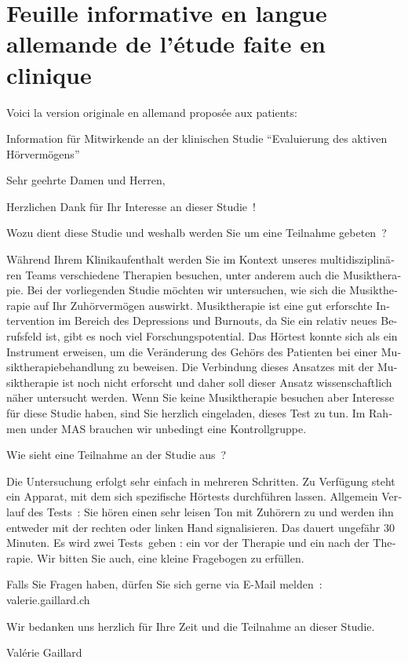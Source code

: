 \section{Feuille informative en langue allemande de l'étude faite en clinique}
Voici la version originale en allemand proposée aux patients:
\begin{german}

Information für Mitwirkende an der klinischen Studie
\foreignquote{german}{Evaluierung des aktiven Hörvermögens}


Sehr geehrte Damen und Herren,

Herzlichen Dank für Ihr Interesse an dieser Studie !

Wozu dient diese Studie und weshalb werden Sie um eine Teilnahme gebeten ?

Während Ihrem Klinikaufenthalt  werden Sie im Kontext
unseres multidisziplinären Teams verschiedene Therapien besuchen, unter anderem auch die Musiktherapie. Bei der vorliegenden Studie möchten wir untersuchen, wie sich die Musiktherapie auf Ihr Zuhörvermögen auswirkt.
Musiktherapie ist eine gut erforschte Intervention im Bereich des Depressions und Burnouts, da Sie ein relativ neues Berufsfeld ist, gibt es noch viel Forschungspotential.
Das Hörtest konnte sich als ein Instrument erweisen, um die Veränderung des Gehörs des Patienten bei einer Musiktherapiebehandlung zu beweisen. Die Verbindung dieses Ansatzes mit der Musiktherapie ist noch nicht erforscht und daher soll dieser Ansatz wissenschaftlich näher untersucht werden.
Wenn Sie keine Musiktherapie besuchen aber Interesse für diese Studie haben, sind Sie herzlich eingeladen, dieses Test zu tun. Im Rahmen under MAS brauchen wir unbedingt eine Kontrollgruppe.

Wie sieht eine Teilnahme an der Studie aus ?

Die Untersuchung erfolgt sehr einfach in mehreren Schritten.
Zu Verfügung steht ein Apparat, mit dem sich spezifische Hörtests durchführen lassen.
Allgemein Verlauf des Tests :
Sie hören einen sehr leisen Ton mit Zuhörern zu und werden ihn entweder mit der rechten  oder linken Hand  signalisieren. Das dauert ungefähr 30 Minuten.
Es wird zwei Tests geben : ein vor der Therapie und ein nach der Therapie.
Wir bitten Sie auch, eine kleine Fragebogen zu erfüllen.


Falls Sie Fragen haben, dürfen Sie sich gerne via E-Mail melden : valerie.gaillard\@gmx.ch

Wir bedanken uns herzlich für Ihre Zeit und die Teilnahme an dieser Studie.

\end{german}
Valérie Gaillard


